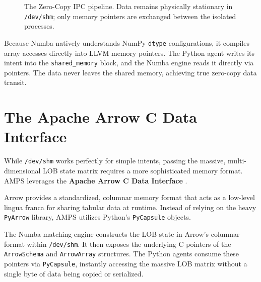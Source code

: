 \begin{figure}[htbp]
\centering
{}
\caption{The Zero-Copy IPC pipeline. Data remains physically stationary in \texttt{/dev/shm}; only memory pointers are exchanged between the isolated processes.}
\label{fig:shm_pipeline}
\end{figure}

Because Numba natively understands NumPy \texttt{dtype} configurations, it compiles array accesses directly into LLVM memory pointers. The Python agent writes its intent into the \texttt{shared\_memory} block, and the Numba engine reads it directly via pointers. The data never leaves the shared memory, achieving true zero-copy data transit.

\section{The Apache Arrow C Data Interface}

While \texttt{/dev/shm} works perfectly for simple intents, passing the massive, multi-dimensional LOB state matrix requires a more sophisticated memory format. AMPS leverages the \textbf{Apache Arrow C Data Interface} \cite{apache_arrow_c_data}.

Arrow provides a standardized, columnar memory format that acts as a low-level lingua franca for sharing tabular data at runtime. Instead of relying on the heavy \texttt{PyArrow} library, AMPS utilizes Python's \texttt{PyCapsule} objects. 

The Numba matching engine constructs the LOB state in Arrow's columnar format within \texttt{/dev/shm}. It then exposes the underlying C pointers of the \texttt{ArrowSchema} and \texttt{ArrowArray} structures. The Python agents consume these pointers via \texttt{PyCapsule}, instantly accessing the massive LOB matrix without a single byte of data being copied or serialized.

